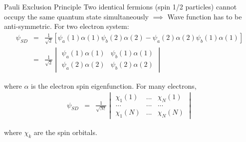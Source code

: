 \documentclass[aspectratio=169]{beamer}
\begin{document}
    \begin{frame}{Pauli Exclusion Principle}
        Two identical fermions (spin 1/2 particles) cannot occupy the same quantum state simultaneously $\implies$ Wave function has to be anti-symmetric. For two electron system:
        \begin{eqnarray*}
            \psi_{SD} & = & \frac{1}{\sqrt{2}}\left[ \psi_a(1) \alpha(1) \psi_b(2) \alpha(2) - \psi_a(2) \alpha(2) \psi_b(1) \alpha(1)\right] \\
            & = & \frac{1}{\sqrt{2}} \begin{vmatrix}
                                         \psi_a(1) \alpha(1) & \psi_b(1) \alpha(1) \\
                                         \psi_a(2) \alpha(2) & \psi_b(2) \alpha(2)
            \end{vmatrix}
        \end{eqnarray*}

        where $\alpha$ is the electron spin eigenfunction. For many electrons,
        \begin{eqnarray*}
            \psi_{SD} & = & \frac{1}{\sqrt{N!}} \begin{vmatrix}
                                                    \chi_1(1) & ... & \chi_N(1) \\
                                                    ...       & ... & ...       \\
                                                    \chi_1(N) & ... & \chi_N(N)
            \end{vmatrix}
        \end{eqnarray*}

        where $\chi_k$ are the spin orbitals.
    \end{frame}
\end{document}

